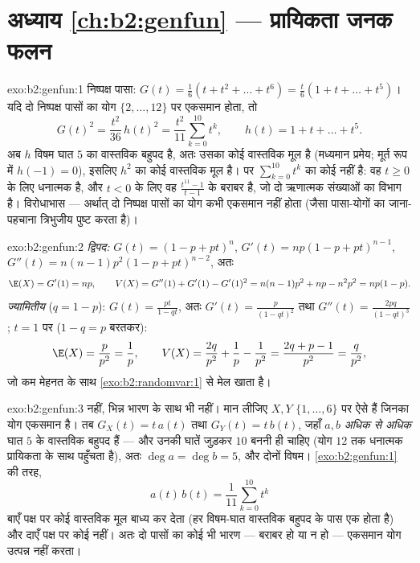 \section*{अध्याय \ref{ch:b2:genfun} --- प्रायिकता जनक फलन}

\begin{solution}{exo:b2:genfun:1}
निष्पक्ष पासा: $G(t) = \frac16(t + t^2 + \dots + t^6) = \frac t6(1 + t
+ \dots + t^5)$। यदि दो निष्पक्ष पासों का योग $\{2, \dots, 12\}$ पर एकसमान
होता, तो
\[
G(t)^2 = \frac{t^2}{36}\,h(t)^2
= \frac{t^2}{11}\sum_{k=0}^{10}t^k ,
\qquad h(t) = 1 + t + \dots + t^5 .
\]
अब $h$ विषम घात $5$ का वास्तविक बहुपद है, अतः उसका कोई वास्तविक मूल
है (मध्यमान प्रमेय; मूर्त रूप में $h(-1) = 0$), इसलिए $h^2$ का कोई वास्तविक
मूल है। पर $\sum_{k=0}^{10}t^k$ का कोई नहीं है: वह $t \geq 0$ के लिए धनात्मक है, और $t < 0$ के
लिए वह $\frac{t^{11} - 1}{t - 1}$ के बराबर है, जो दो ऋणात्मक संख्याओं का विभाग है।
विरोधाभास --- अर्थात् दो निष्पक्ष पासों का योग कभी एकसमान नहीं होता
(जैसा पासा-योगों का जाना-पहचाना त्रिभुजीय  पुष्ट करता है)।
\end{solution}

\begin{solution}{exo:b2:genfun:2}
\emph{द्विपद:} $G(t) = (1 - p + pt)^n$, $G'(t) = np(1 - p +
pt)^{n-1}$, $G''(t) = n(n-1)p^2(1 - p + pt)^{n-2}$, अतः
\[
\E(X) = G'(1) = np,
\qquad
V(X) = G''(1) + G'(1) - G'(1)^2
= n(n-1)p^2 + np - n^2p^2 = np(1-p).
\]
\emph{ज्यामितीय} ($q = 1 - p$): $G(t) = \frac{pt}{1 - qt}$, अतः $G'(t) = \frac{p}{(1 - qt)^2}$ तथा $G''(t) = \frac{2pq}{(1 -
qt)^3}$; $t = 1$ पर ($1 - q = p$ बरतकर):
\[
\E(X) = \frac{p}{p^2} = \frac1p,
\qquad
V(X) = \frac{2q}{p^2} + \frac1p - \frac{1}{p^2}
= \frac{2q + p - 1}{p^2}
= \frac{q}{p^2} ,
\]
जो कम मेहनत के साथ \cref{exo:b2:randomvar:1} से मेल खाता है।
\end{solution}

\begin{solution}{exo:b2:genfun:3}
नहीं, भिन्न भारण के साथ भी नहीं। मान लीजिए $X, Y$ $\{1, \dots, 6\}$ पर ऐसे  हैं
जिनका योग एकसमान है। तब $G_X(t) = t\,a(t)$ तथा $G_Y(t) = t\,b(t)$, जहाँ $a, b$ \emph{अधिक से अधिक}
घात $5$ के वास्तविक बहुपद हैं --- और उनकी घातें जुड़कर $10$ बननी ही
चाहिए (योग $12$ तक धनात्मक प्रायिकता के साथ पहुँचता है), अतः $\deg a = \deg b = 5$, और
दोनों विषम। \cref{exo:b2:genfun:1} की तरह,
\[
a(t)\,b(t) = \frac{1}{11}\sum_{k=0}^{10}t^k
\]
बाएँ पक्ष पर कोई वास्तविक मूल बाध्य कर देता (हर विषम-घात वास्तविक
बहुपद के पास एक होता है) और दाएँ पक्ष पर कोई नहीं। अतः दो 
पासों का कोई भी भारण --- बराबर हो या न हो --- एकसमान योग उत्पन्न
नहीं करता।
\end{solution}

